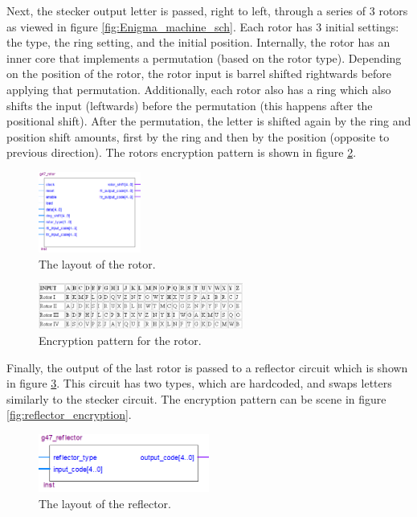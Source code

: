 \documentclass[10pt]{article}
\begin{document}
Next, the stecker output letter is passed, right to left, through a series of 3 rotors as viewed in figure \ref{fig:Enigma_machine_sch}. Each rotor has 3 initial settings: the type, the ring setting, and the initial position. Internally, the rotor has an inner core that implements a permutation (based on the rotor type). Depending on the position of the rotor, the rotor input is barrel shifted rightwards before applying that permutation. Additionally, each rotor also has a ring which also shifts the input (leftwards) before the permutation (this happens after the positional shift). After the permutation, the letter is shifted again by the ring and position shift amounts, first by the ring and then by the position (opposite to previous direction). The rotors encryption pattern is shown in figure \ref{fig:rotor_encryption}.
\begin{figure}[!htb]
    \centering
    \includegraphics[width=0.3\textwidth]{./rotor_layout.png}
    \caption{The layout of the rotor.}
    \label{fig:rotor_layout}
\end{figure}
\begin{figure}[!htb]
    \centering
    \includegraphics[width=0.6\textwidth]{./rotor_encryption.png}
    \caption{Encryption pattern for the rotor.}
    \label{fig:rotor_encryption}
\end{figure}
\newpage
Finally, the output of the last rotor is passed to a reflector circuit which is shown in figure \ref{fig:reflector_layout}. This circuit has two types, which are hardcoded, and swaps letters similarly to the stecker circuit. The encryption pattern can be scene in figure \ref{fig:reflector_encryption}.
\begin{figure}[!htb]
    \centering
    \includegraphics[width=0.5\textwidth]{./reflector_layout.png}
    \caption{The layout of the reflector.}
    \label{fig:reflector_layout}
\end{figure}
\end{document}
